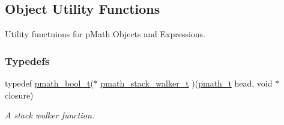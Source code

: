 \hypertarget{group__helpers}{
\subsection{Object Utility Functions}
\label{group__helpers}
}
Utility functuions for pMath Objects and Expressions.  


\subsubsection*{Typedefs}
\begin{CompactItemize}
\item 
typedef \hyperlink{group__general__types_gc92090cb0b56345d6c379ed2341d4ef4}{pmath\_\-bool\_\-t}($\ast$ \hyperlink{group__helpers_g11afc6451921f3169224096723483c64}{pmath\_\-stack\_\-walker\_\-t} )(\hyperlink{classpmath__t}{pmath\_\-t} head, void $\ast$closure)
\begin{CompactList}\small\item\em A stack walker function. \item\end{CompactList}\end{CompactItemize}

